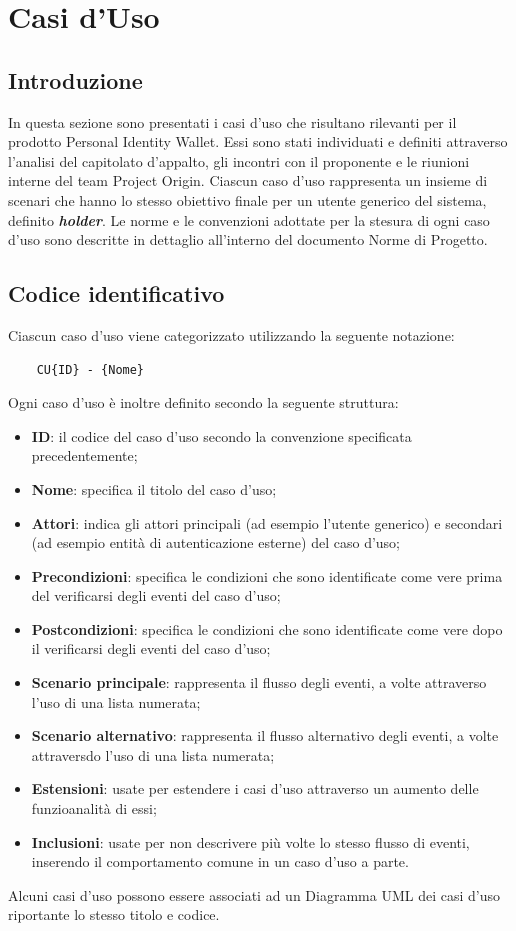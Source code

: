 \section{Casi d'Uso}
\subsection{Introduzione}
In questa sezione sono presentati i casi d'uso che risultano rilevanti per il prodotto Personal Identity Wallet. 
Essi sono stati individuati e definiti attraverso l'analisi del capitolato d'appalto, gli incontri con il proponente e le riunioni interne del team Project Origin.
Ciascun caso d'uso rappresenta un insieme di scenari che hanno lo stesso obiettivo finale per un utente generico del sistema, definito \textbf{\textit{holder}}.
Le norme e le convenzioni adottate per la stesura di ogni caso d'uso sono descritte in dettaglio all'interno del documento Norme di Progetto.
 \subsection{Codice identificativo}
Ciascun caso d'uso viene categorizzato utilizzando la seguente notazione:
\begin{center}\begin{verbatim}
    CU{ID} - {Nome}
\end{verbatim}\end{center}
Ogni caso d’uso è inoltre definito secondo la seguente struttura:
\begin{itemize}
    \item \textbf{ID}: il codice del caso d’uso secondo la convenzione specificata precedentemente;
    \item \textbf{Nome}:  specifica il titolo del caso d’uso;
    \item \textbf{Attori}:  indica gli attori principali (ad esempio l’utente generico) e secondari (ad esempio entità di autenticazione esterne) del caso d’uso;
    \item \textbf{Precondizioni}:  specifica le condizioni che sono identificate come vere prima del verificarsi degli eventi del caso d’uso;
    \item \textbf{Postcondizioni}:  specifica  le  condizioni  che  sono  identificate  come  vere  dopo  il verificarsi degli eventi del caso d’uso;
    \item \textbf{Scenario  principale}:  rappresenta  il  flusso  degli  eventi,  a  volte  attraverso  l'uso di  una  lista  numerata;
    \item \textbf{Scenario alternativo}: rappresenta il flusso alternativo degli eventi, a volte attraversdo l'uso di una lista numerata;
    \item \textbf{Estensioni}: usate per estendere i casi d'uso attraverso un aumento delle funzioanalità di essi;
    \item \textbf{Inclusioni}:  usate per non descrivere più volte lo stesso flusso di eventi, inserendo il comportamento comune in un caso d’uso a parte.
\end{itemize}
Alcuni  casi  d’uso  possono  essere  associati  ad  un Diagramma UML  dei  casi  d'uso riportante lo stesso titolo e codice.
